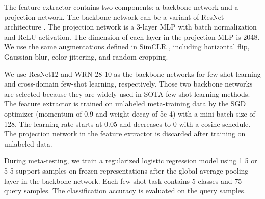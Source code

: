 \documentclass{article}
\begin{document}
The feature extractor  contains two components: a backbone network and a projection network. The backbone network can be a variant of ResNet architecture \citep{he:etal:2016}. The projection network is a 3-layer MLP with batch normalization and ReLU activation. The dimension of each layer in the projection MLP is 2048. We use the same augmentations defined in SimCLR \citep{chen:etal:2020simclr}, including horizontal flip, Gaussian blur, color jittering, and random cropping.

We use ResNet12 \citep{lee:etal:2019meta,ravichandran:etal:2019} and WRN-28-10 \citep{yue:etal:2020} as the backbone networks for few-shot learning and cross-domain few-shot learning, respectively. Those two backbone networks are selected because they are widely used in SOTA few-shot learning methods. The feature extractor is trained on unlabeled meta-training data by the SGD optimizer (momentum of 0.9 and weight decay of 5e-4) with a mini-batch size of 128. The learning rate starts at 0.05 and decreases to 0 with a cosine schedule. The projection network in the feature extractor is discarded after training on unlabeled data. 

During meta-testing, we train a regularized logistic regression model using 1  5 or 5  5 support samples on frozen representations after the global average pooling layer in the backbone network. Each few-shot task contains 5 classes and 75 query samples. The classification accuracy is evaluated on the query samples. 
\end{document}
